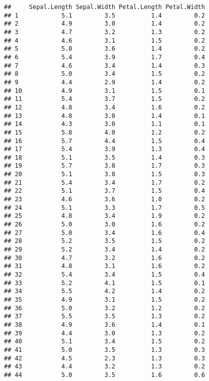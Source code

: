 \documentclass[]{article}
\begin{document}
\begin{verbatim}
##     Sepal.Length Sepal.Width Petal.Length Petal.Width
## 1            5.1         3.5          1.4         0.2
## 2            4.9         3.0          1.4         0.2
## 3            4.7         3.2          1.3         0.2
## 4            4.6         3.1          1.5         0.2
## 5            5.0         3.6          1.4         0.2
## 6            5.4         3.9          1.7         0.4
## 7            4.6         3.4          1.4         0.3
## 8            5.0         3.4          1.5         0.2
## 9            4.4         2.9          1.4         0.2
## 10           4.9         3.1          1.5         0.1
## 11           5.4         3.7          1.5         0.2
## 12           4.8         3.4          1.6         0.2
## 13           4.8         3.0          1.4         0.1
## 14           4.3         3.0          1.1         0.1
## 15           5.8         4.0          1.2         0.2
## 16           5.7         4.4          1.5         0.4
## 17           5.4         3.9          1.3         0.4
## 18           5.1         3.5          1.4         0.3
## 19           5.7         3.8          1.7         0.3
## 20           5.1         3.8          1.5         0.3
## 21           5.4         3.4          1.7         0.2
## 22           5.1         3.7          1.5         0.4
## 23           4.6         3.6          1.0         0.2
## 24           5.1         3.3          1.7         0.5
## 25           4.8         3.4          1.9         0.2
## 26           5.0         3.0          1.6         0.2
## 27           5.0         3.4          1.6         0.4
## 28           5.2         3.5          1.5         0.2
## 29           5.2         3.4          1.4         0.2
## 30           4.7         3.2          1.6         0.2
## 31           4.8         3.1          1.6         0.2
## 32           5.4         3.4          1.5         0.4
## 33           5.2         4.1          1.5         0.1
## 34           5.5         4.2          1.4         0.2
## 35           4.9         3.1          1.5         0.2
## 36           5.0         3.2          1.2         0.2
## 37           5.5         3.5          1.3         0.2
## 38           4.9         3.6          1.4         0.1
## 39           4.4         3.0          1.3         0.2
## 40           5.1         3.4          1.5         0.2
## 41           5.0         3.5          1.3         0.3
## 42           4.5         2.3          1.3         0.3
## 43           4.4         3.2          1.3         0.2
## 44           5.0         3.5          1.6         0.6

\end{verbatim}
\end{document}
